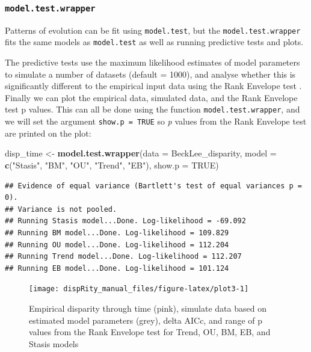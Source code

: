 \documentclass[]{book}
\newenvironment{Shaded}{\begin{snugshade}}{\end{snugshade}}
\newcommand{\DataTypeTok}[1]{\textcolor[rgb]{0.13,0.29,0.53}{#1}}
\newcommand{\KeywordTok}[1]{\textcolor[rgb]{0.13,0.29,0.53}{\textbf{#1}}}
\newcommand{\NormalTok}[1]{#1}
\newcommand{\OtherTok}[1]{\textcolor[rgb]{0.56,0.35,0.01}{#1}}
\newcommand{\StringTok}[1]{\textcolor[rgb]{0.31,0.60,0.02}{#1}}
\begin{document}
\hypertarget{model.test.wrapper}{%
\subsubsection{\texorpdfstring{\texttt{model.test.wrapper}}{model.test.wrapper}}\label{model.test.wrapper}}

Patterns of evolution can be fit using \texttt{model.test}, but the \texttt{model.test.wrapper} fits the same models as \texttt{model.test} as well as running predictive tests and plots.

The predictive tests use the maximum likelihood estimates of model parameters to simulate a number of datasets (default = 1000), and analyse whether this is significantly different to the empirical input data using the Rank Envelope test \citep{murrell2018global}.
Finally we can plot the empirical data, simulated data, and the Rank Envelope test p values.
This can all be done using the function \texttt{model.test.wrapper}, and we will set the argument \texttt{show.p\ =\ TRUE} so \emph{p} values from the Rank Envelope test are printed on the plot:

\begin{Shaded}
\begin{Highlighting}[]
\NormalTok{disp_time <-}\StringTok{ }\KeywordTok{model.test.wrapper}\NormalTok{(}\DataTypeTok{data =}\NormalTok{ BeckLee_disparity,}
                    \DataTypeTok{model =} \KeywordTok{c}\NormalTok{(}\StringTok{"Stasis"}\NormalTok{, }\StringTok{"BM"}\NormalTok{, }\StringTok{"OU"}\NormalTok{, }\StringTok{"Trend"}\NormalTok{, }\StringTok{"EB"}\NormalTok{),}
                                \DataTypeTok{show.p =} \OtherTok{TRUE}\NormalTok{)}
\end{Highlighting}
\end{Shaded}

\begin{verbatim}
## Evidence of equal variance (Bartlett's test of equal variances p = 0).
## Variance is not pooled.
## Running Stasis model...Done. Log-likelihood = -69.092
## Running BM model...Done. Log-likelihood = 109.829
## Running OU model...Done. Log-likelihood = 112.204
## Running Trend model...Done. Log-likelihood = 112.207
## Running EB model...Done. Log-likelihood = 101.124
\end{verbatim}

\begin{figure}

{\centering \texttt{[image: dispRity\_manual\_files/figure-latex/plot3-1]} 

}

\caption{Empirical disparity through time (pink), simulate data based on estimated model parameters (grey), delta AICc, and range of p values from the Rank Envelope test for Trend, OU, BM, EB, and Stasis models}\label{fig:plot3}
\end{figure}
\end{document}
